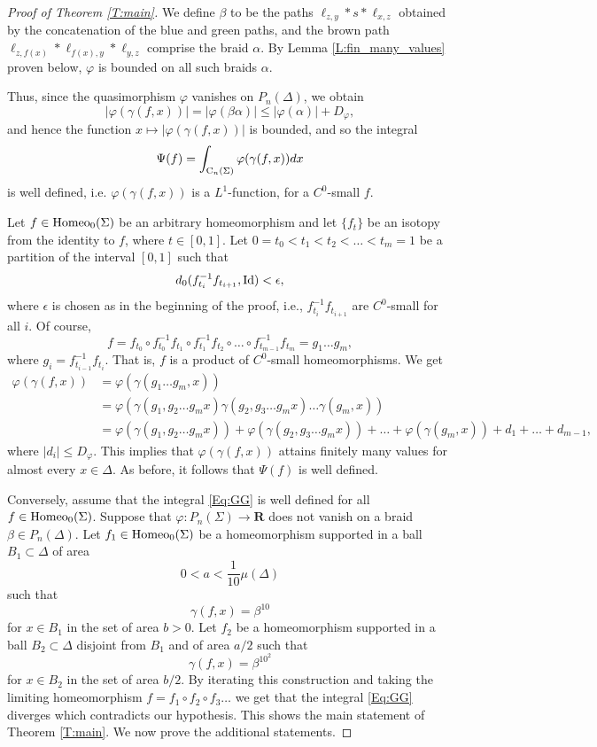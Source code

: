 \documentclass[11pt]{amsart}
\theoremstyle{definition}
\theoremstyle{remark}
\numberwithin{equation}{section}
\numberwithin{figure}{section}
\newcommand{\B}[1]{{\mathbf #1}}
\begin{document}
\begin{proof}[Proof of Theorem \ref{T:main}]
We define $\beta$ to be the paths 
$\ell_{z,y}*s*\ell_{x,z}$
obtained by the concatenation of the blue and green paths, and the brown path
$\ell_{z,f(x)}*\ell_{f(x),y}*\ell_{y,z}$ comprise the braid $\alpha$. By Lemma \ref{L:fin_many_values} proven below, 
$\varphi$ is bounded on all such braids $\alpha$. 

Thus, since the quasimorphism $\varphi$ vanishes on $P_n(\Delta)$, we obtain
\begin{equation}
|\varphi(\gamma(f,x))| = |\varphi(\beta\alpha)|
\leq |\varphi(\alpha)| + D_{\varphi},
\label{Eq:bounded-fi-gamma} 
\end{equation}
and hence the function $x\mapsto |\varphi(\gamma(f,x))|$ is bounded,
and so the integral
$$\Psi(f) = \int_{{\rm C}_n(\Sigma)}\varphi(\gamma(f,x))dx$$
is well defined, i.e. $\varphi(\gamma(f,x))$ is a $L^1$-function, 
for a $C^0$-small $f$.

Let $f\in {\rm Homeo}_0(\Sigma)$ be an arbitrary homeomorphism and let
$\{f_t\}$ be an isotopy from the identity to $f$, where $t\in [0,1]$.
Let $0=t_0<t_1<t_2 <\dots < t_m=1$ be a partition of the interval $[0,1]$
such that 
$$d_0(f_{t_i}^{-1}f_{t_{i+1}},{\rm Id}) < \epsilon,$$ 
where $\epsilon$ is chosen as in the beginning of the proof, i.e., $f_{t_i}^{-1}f_{t_{i+1}}$ are $C^0$-small for all $i$. Of course,
$$
f = f_{t_0}\circ f_{t_0}^{-1}f_{t_1}\circ f^{-1}_{t_1}f_{t_2}\circ \dots \circ f_{t_{m-1}}^{-1}f_{t_m}
=g_1\dots g_m,
$$
where $g_i = f_{t_{i-1}}^{-1}f_{t_i}$.
That is, $f$ is a product of $C^0$-small homeomorphisms. We get 
\begin{align*}
\varphi(\gamma(f,x))
&=\varphi(\gamma(g_1\dots g_m,x))\\
&=\varphi(\gamma(g_1,g_2\dots g_mx)\gamma(g_2,g_3\dots g_mx)\dots \gamma(g_m,x))\\
&=\varphi(\gamma(g_1,g_2\dots g_mx))+ \varphi(\gamma(g_2,g_3\dots g_mx))+ \dots +\varphi(\gamma(g_m,x))
+ d_1+\dots +d_{m-1},
\end{align*}
where $|d_i|\leq D_{\varphi}$. 
This implies that $\varphi(\gamma(f,x))$ attains finitely many values for
almost every $x\in \Delta$. 
As before, it follows that $\Psi(f)$ is well defined.  

Conversely, assume that the integral \eqref{Eq:GG} is well defined for
all $f\in {\rm Homeo}_0(\Sigma)$. 
Suppose that $\varphi \colon P_n(\Sigma)\to \B R$
does not vanish on a braid $\beta\in P_n(\Delta)$. Let $f_1\in {\rm Homeo}_0(\Sigma)$
be a homeomorphism supported in a ball $B_1\subset \Delta$ of area 
$$0<a<\frac{1}{10}\mu(\Delta)$$
such that 
$$\gamma(f,x)=\beta^{10}$$
for $x\in B_1$ in the set of area $b>0$.
Let $f_2$ be a homeomorphism supported in a ball $B_2 \subset \Delta$ disjoint from $B_1$ and of area
$a/2$ such that 
$$\gamma(f,x)=\beta^{10^2}$$
for $x\in B_2$ in the set of area $b/2$.
By iterating this construction and taking the limiting homeomorphism 
$f=f_1\circ f_2\circ f_3\dots$ we get that the integral \eqref{Eq:GG} diverges which
contradicts our hypothesis. This shows the main statement of Theorem \ref{T:main}.
We now prove the additional statements. 


\end{proof}
\end{document}
